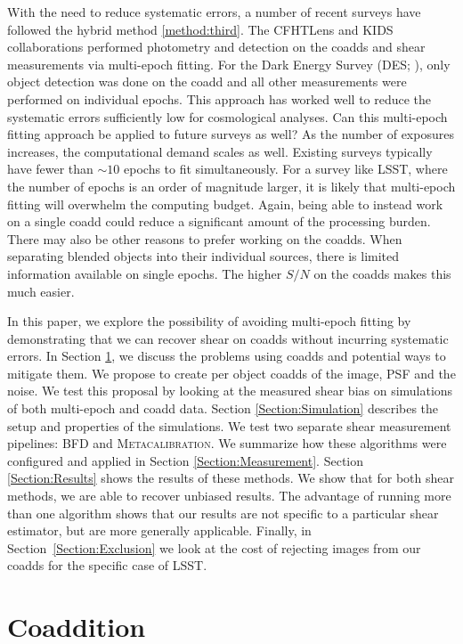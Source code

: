 \documentclass[fleqn,useAMS,usenatbib]{mnras}
\newcommand{\Mcal}{\textsc{Metacalibration}}
\begin{document}
With the need to reduce systematic errors, a number of recent surveys have 
followed the hybrid method \ref{method:third}.  The CFHTLens 
\citep{Heymans2013} and KIDS \citep{Hildebrandt2017} collaborations performed 
photometry and detection on the coadds and shear measurements via multi-epoch 
fitting. For the Dark Energy Survey (DES; \citealt{Zuntz2017}), only object 
detection was done on the coadd and all other measurements were performed on 
individual epochs.  This approach has worked well to reduce the systematic 
errors sufficiently low for cosmological analyses.  Can this multi-epoch 
fitting approach be applied to future surveys as well?
As the number of exposures increases, the computational demand scales as well.  
Existing surveys typically have fewer than $\sim10$ epochs to fit 
simultaneously. For a survey like LSST, where the number of epochs is an order 
of magnitude larger, it is likely that multi-epoch fitting will overwhelm the 
computing budget.  Again, being able to instead work on a single coadd could 
reduce a significant amount of the processing burden.  There may also be other 
reasons to prefer working on the coadds.  When separating blended objects into 
their individual sources, there is limited information available on single 
epochs.  The higher $S/N$ on the coadds makes this much easier.  

In this paper, we explore the possibility of avoiding multi-epoch fitting by 
demonstrating that we can recover shear on coadds without incurring systematic 
errors.  In Section \ref{Section:Coaddition}, we discuss the problems using 
coadds and potential ways to mitigate them.  We propose to create per object 
coadds of the image, PSF and the noise.  We test this proposal by looking at 
the measured shear bias on simulations of both multi-epoch and coadd data.  
Section \ref{Section:Simulation} describes the setup and properties of the 
simulations.  We test two separate shear measurement pipelines: BFD and 
\Mcal.  We summarize how these algorithms were configured and applied 
in Section \ref{Section:Measurement}.  Section \ref{Section:Results} shows the 
results of these methods.  We show that for both shear methods, we are able to 
recover unbiased results.  The advantage of running more than one algorithm 
shows that our results are not specific to a particular shear estimator, but 
are more generally applicable.   Finally, in Section~\ref{Section:Exclusion} 
we look at the cost of rejecting images from our coadds for the specific case 
of LSST.

\section{Coaddition}
\label{Section:Coaddition}
\end{document}
